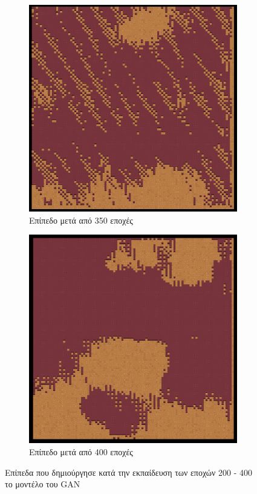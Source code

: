 \begin{figure}[H]
\begin{subfigure}{.5\textwidth}
  \centering
  \includegraphics[width=.8\linewidth]{../images/generated/350.png}
  \caption{Επίπεδο μετά από 350 εποχές}
  \label{fig:sfig2}
\end{subfigure}
\begin{subfigure}{.5\textwidth}
  \centering
  \includegraphics[width=.8\linewidth]{../images/generated/400.png}
  \caption{Επίπεδο μετά από 400 εποχές}
  \label{fig:sfig2}
\end{subfigure}
\caption{Επίπεδα που δημιούργησε κατά την εκπαίδευση των εποχών 200 - 400 το μοντέλο του GAN}
\label{fig:fig}
\end{figure}


